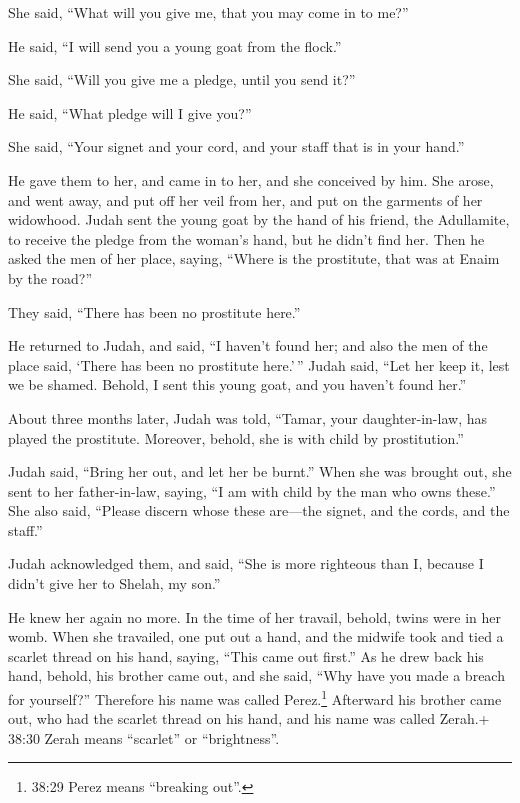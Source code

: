 She said, ``What will you give me, that you may come in to me?''

 He said, ``I will send you a young goat from the flock.''

She said, ``Will you give me a pledge, until you send it?''

 He said, ``What pledge will I give you?''

She said, ``Your signet and your cord, and your staff that is in your
hand.''

He gave them to her, and came in to her, and she conceived by him.
 She arose, and went away, and put off her veil from her,
and put on the garments of her widowhood.  Judah sent the
young goat by the hand of his friend, the Adullamite, to receive the
pledge from the woman's hand, but he didn't find her.  Then
he asked the men of her place, saying, ``Where is the prostitute, that
was at Enaim by the road?''

They said, ``There has been no prostitute here.''

 He returned to Judah, and said, ``I haven't found her; and
also the men of the place said, `There has been no prostitute here.'\,''
 Judah said, ``Let her keep it, lest we be shamed. Behold,
I sent this young goat, and you haven't found her.''

 About three months later, Judah was told, ``Tamar, your
daughter-in-law, has played the prostitute. Moreover, behold, she is
with child by prostitution.''

Judah said, ``Bring her out, and let her be burnt.''  When
she was brought out, she sent to her father-in-law, saying, ``I am with
child by the man who owns these.'' She also said, ``Please discern whose
these are---the signet, and the cords, and the staff.''

 Judah acknowledged them, and said, ``She is more righteous
than I, because I didn't give her to Shelah, my son.''

He knew her again no more.  In the time of her travail,
behold, twins were in her womb.  When she travailed, one
put out a hand, and the midwife took and tied a scarlet thread on his
hand, saying, ``This came out first.''  As he drew back his
hand, behold, his brother came out, and she said, ``Why have you made a
breach for yourself?'' Therefore his name was called Perez.\footnote{38:29
  Perez means ``breaking out''.}  Afterward his brother
came out, who had the scarlet thread on his hand, and his name was
called Zerah.+ 38:30 Zerah means ``scarlet'' or ``brightness''.

